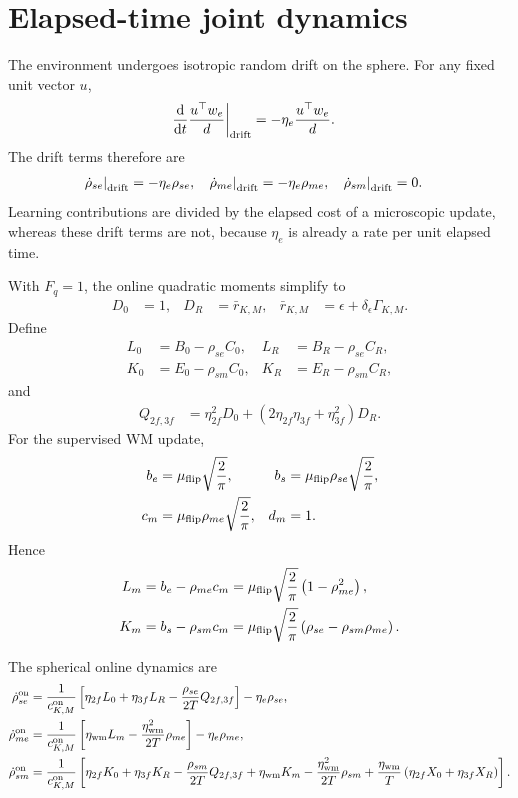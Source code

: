 \documentclass{article}
\newcommand*\dd{\mathrm d}
\begin{document}
\section{Elapsed-time joint dynamics}

The environment undergoes isotropic random drift on the sphere. For any fixed unit vector $u$,
\begin{align}
\left.\frac{\dd}{\dd t}\frac{u^\top w_e}{d}\right|_{\rm drift} &= -\eta_e\frac{u^\top w_e}{d}.
\end{align}
The drift terms therefore are
\begin{align}
\left.\dot\rho_{se}\right|_{\rm drift} &= -\eta_e\rho_{se}, & \left.\dot\rho_{me}\right|_{\rm drift} &= -\eta_e\rho_{me}, & \left.\dot\rho_{sm}\right|_{\rm drift} &= 0.
\end{align}
Learning contributions are divided by the elapsed cost of a microscopic update, whereas these drift terms are not, because $\eta_e$ is already a rate per unit elapsed time.

With $F_q=1$, the online quadratic moments simplify to
\begin{align}
D_0 &= 1, & D_R &= \bar r_{K,M}, & \bar r_{K,M} &= \epsilon+\delta_\epsilon\Gamma_{K,M}.
\end{align}
Define
\begin{align}
L_0 &= B_0-\rho_{se}C_0, & L_R &= B_R-\rho_{se}C_R, \\
K_0 &= E_0-\rho_{sm}C_0, & K_R &= E_R-\rho_{sm}C_R,
\end{align}
and
\begin{align}
Q_{2f,3f} &= \eta_{2f}^2D_0+\left(2\eta_{2f}\eta_{3f}+\eta_{3f}^2\right)D_R.
\end{align}
For the supervised WM update,
\begin{align}
b_e &= \mu_{\rm flip}\sqrt{\frac{2}{\pi}}, & b_s &= \mu_{\rm flip}\rho_{se}\sqrt{\frac{2}{\pi}}, \\
c_m &= \mu_{\rm flip}\rho_{me}\sqrt{\frac{2}{\pi}}, & d_m &= 1.
\end{align}
Hence
\begin{align}
L_m &= b_e-\rho_{me}c_m=\mu_{\rm flip}\sqrt{\frac{2}{\pi}}\left(1-\rho_{me}^2\right), \\
K_m &= b_s-\rho_{sm}c_m=\mu_{\rm flip}\sqrt{\frac{2}{\pi}}\left(\rho_{se}-\rho_{sm}\rho_{me}\right).
\end{align}

The spherical online dynamics are
\begin{align}
\dot\rho_{se}^{\rm on} &= \frac{1}{c_{K,M}^{\rm on}}\left[\eta_{2f}L_0+\eta_{3f}L_R-\frac{\rho_{se}}{2T}Q_{2f,3f}\right]-\eta_e\rho_{se}, \\
\dot\rho_{me}^{\rm on} &= \frac{1}{c_{K,M}^{\rm on}}\left[\eta_{\rm wm}L_m-\frac{\eta_{\rm wm}^2}{2T}\rho_{me}\right]-\eta_e\rho_{me}, \\
\dot\rho_{sm}^{\rm on} &= \frac{1}{c_{K,M}^{\rm on}}\left[\eta_{2f}K_0+\eta_{3f}K_R-\frac{\rho_{sm}}{2T}Q_{2f,3f}+\eta_{\rm wm}K_m-\frac{\eta_{\rm wm}^2}{2T}\rho_{sm}+\frac{\eta_{\rm wm}}{T}\left(\eta_{2f}X_0+\eta_{3f}X_R\right)\right].
\end{align}
\end{document}
